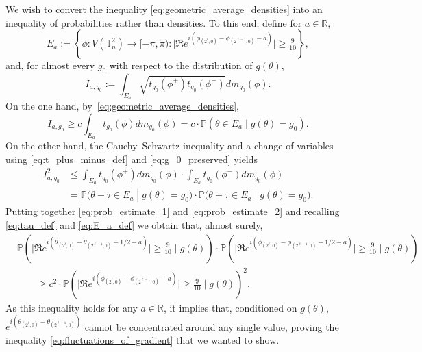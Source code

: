 \documentclass[12pt,reqno]{article}
\def\R{\mathbb{R}}
\def\P{\mathbb{P}}
\def\T{\mathbb{T}}
\begin{document}
We wish to convert the inequality
\eqref{eq:geometric_average_densities} into an inequality of
probabilities rather than densities. To this end, define for
$a\in\R$,
\begin{equation}\label{eq:E_a_def}
  E_a:=\left\{\phi:V(\T_n^2)\to[-\pi,\pi)\colon\big|\Re e^{i(\phi_{(2^\ell,0)}-\phi_{(2^{\ell-1},0)} - a)}\big|\ge \tfrac{9}{10}\right\},
\end{equation}
and, for almost every $g_0$ with respect to the distribution of
$g(\theta)$,
\begin{equation*}
  I_{a,g_0}:=\int_{E_a} \sqrt{t_{g_0}(\phi^+)t_{g_0}(\phi^-)}dm_{g_0}(\phi).
\end{equation*}
On the one hand, by~\eqref{eq:geometric_average_densities},
\begin{equation}\label{eq:prob_estimate_1}
  I_{a,g_0} \ge c\int_{E_a} t_{g_0}(\phi)dm_{g_0}(\phi) = c\cdot \P\left(\theta\in E_a\; |\; g(\theta)=g_0\right).
\end{equation}
On the other hand, the Cauchy--Schwartz inequality and a change of
variables using \eqref{eq:t_plus_minus_def} and
\eqref{eq:g_0_preserved} yields
\begin{equation}\label{eq:prob_estimate_2}
\begin{split}
  I_{a,g_0}^2&\le \int_{E_a} t_{g_0}(\phi^+) dm_{g_0}(\phi) \cdot \int_{E_a} t_{g_0}(\phi^-) dm_{g_0}(\phi)\\
  &= \P\big(\theta - \tau\in E_a\; |\; g(\theta)=g_0\big)\cdot \P\big(\theta + \tau\in E_a\; |\; g(\theta)=g_0\big).
\end{split}
\end{equation}
Putting together \eqref{eq:prob_estimate_1} and
\eqref{eq:prob_estimate_2} and recalling \eqref{eq:tau_def} and
\eqref{eq:E_a_def} we obtain that, almost surely,
\begin{align*}
&\P\left(\big|\Re e^{i(\theta_{(2^\ell,0)}-\theta_{(2^{\ell-1},0)} + 1/2 - a)}\big|\ge \tfrac{9}{10} \mid g(\theta)\right)\cdot
\P\left(\big|\Re e^{i(\phi_{(2^\ell,0)}-\phi_{(2^{\ell-1},0)} - 1/2 - a)}\big|\ge \tfrac{9}{10} \mid g(\theta)\right)\\
&\qquad\ge c^2\cdot\P\left(\big|\Re e^{i(\phi_{(2^\ell,0)}-\phi_{(2^{\ell-1},0)} - a)}\big|\ge \tfrac{9}{10} \mid g(\theta)\right)^2.
\end{align*}
As this inequality holds for any $a\in\R$, it implies that,
conditioned on $g(\theta)$,
$e^{i\left(\theta_{(2^\ell,0)}-\theta_{(2^{\ell-1},0)}\right)}$ cannot be
concentrated around any single value, proving the inequality
\eqref{eq:fluctuations_of_gradient} that we wanted to show.
\end{document}
